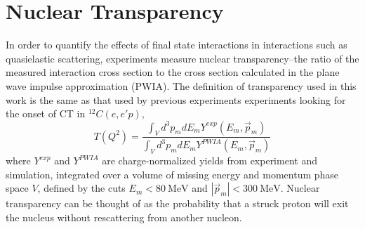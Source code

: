 \section{Nuclear Transparency}
In order to quantify the effects of final state interactions in interactions
such as quasielastic scattering, experiments measure nuclear transparency--the
ratio of
the measured interaction cross section
to
the cross section calculated in the plane wave impulse approximation (PWIA).
The definition of transparency used in this work is the same as that used by
previous experiments experiments looking for the onset of CT in
$^{12}C(e,e'p)$,
\begin{equation} \label{eqn:transparency_definition}
    T(Q^2) = \frac{\int_{V} d^{3} p_{m} d E_{m} Y^{exp }(E_{m}, \vec{p}_{m})}
                  {\int_{V} d^{3} p_{m} d E_{m} Y^{PWIA}(E_{m}, \vec{p}_{m})}
\end{equation}
where $Y^{exp}$ and $Y^{PWIA}$ are charge-normalized yields from experiment and
simulation, integrated over a volume of missing energy and momentum phase space
$V$, defined by the cuts $E_m < \SI{80}{\mega\electronvolt}$ and
$|\vec{p}_m| < \SI{300}{\mega\electronvolt}$.
Nuclear transparency can be thought of as the probability that a struck proton
will exit the nucleus without rescattering from another nucleon.

